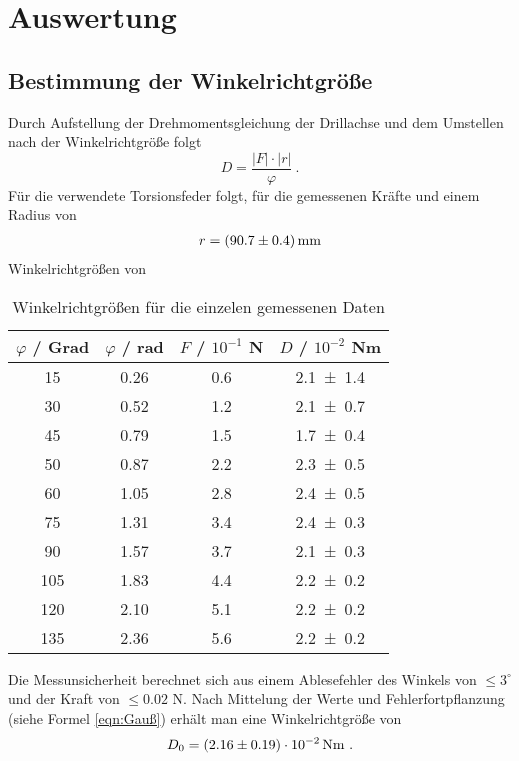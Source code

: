 \section{Auswertung}
\label{sec:Auswertung}
\subsection{Bestimmung der Winkelrichtgröße}

Durch Aufstellung der Drehmomentsgleichung der Drillachse und dem Umstellen nach der Winkelrichtgröße folgt
\begin{equation}
	D = \frac{ |F| \cdot |r|}{\varphi} \ .
\end{equation}
Für die verwendete Torsionsfeder folgt, für die gemessenen Kräfte und einem Radius von
\begin{align*}
	r = (\num{90.7 +- 0.4}) \, \text{mm}
\end{align*}
Winkelrichtgrößen von

\begin{table}[ht]
	\centering
	\caption{Winkelrichtgrößen für die einzelen gemessenen Daten}
	\label{tab:winkelrichtgröße}
	\begin{tabular}{c c c c}
		\toprule
		$\varphi$ / Grad & $\varphi$ / rad & $F$ / $10^{-1}$ N & $D$ / $10^{-2}$ Nm \\
		\midrule
		15 & 0.26 & 0.6 & \num{2.1 +- 1.4} \\
		30 & 0.52 & 1.2 & \num{2.1 +- 0.7} \\
		45 & 0.79 & 1.5 & \num{1.7 +- 0.4} \\
		50 & 0.87 & 2.2 & \num{2.3 +- 0.5} \\
		60 & 1.05 & 2.8 & \num{2.4 +- 0.5} \\
		75 & 1.31 & 3.4 & \num{2.4 +- 0.3} \\
		90 & 1.57 & 3.7 & \num{2.1 +- 0.3} \\
		105& 1.83 & 4.4 & \num{2.2 +- 0.2} \\
		120& 2.10 & 5.1 & \num{2.2 +- 0.2} \\
		135& 2.36 & 5.6 & \num{2.2 +- 0.2} \\
		\bottomrule
	\end{tabular}
\end{table}

Die Messunsicherheit berechnet sich aus einem Ablesefehler des Winkels von $\le 3^\circ $ und der Kraft von $\le 0.02$ N. Nach Mittelung der Werte und Fehlerfortpflanzung (siehe Formel \ref{eqn:Gauß}) erhält man eine Winkelrichtgröße von
\begin{align*}
	D_\text{0} = (\num{2.16 +- 0.19}) \cdot 10^{-2} \, \text{Nm} \ .
\end{align*}



